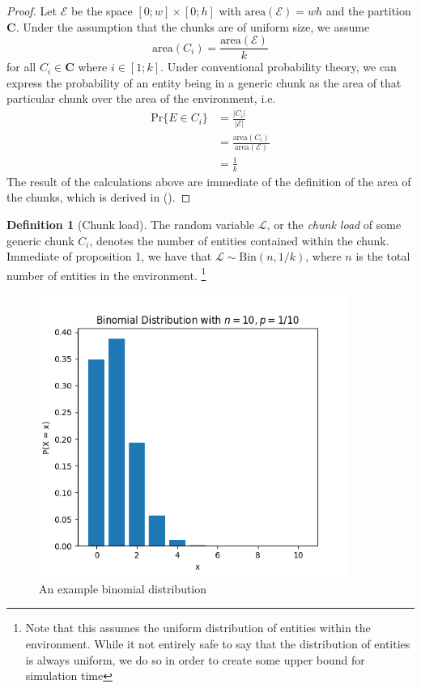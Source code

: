\documentclass[a4paper, 12pt]{report}
\theoremstyle{definition}
\newtheorem{definition}{Definition}[chapter]
\begin{document}
\begin{proof}
    Let $\mathscr E$ be the space $[0; w] \times [0;h]$ with $\text{area}(\mathscr E) = wh$ and the partition $\mathbf C$. Under the assumption that the chunks
    are of uniform size, we assume
    \[
        \text{area}(C_i) = \frac{\text{area}(\mathscr E)}{k} \tag{\textasteriskcentered}
    \]
    for all $C_i \in \mathbf C$ where $i \in [1; k]$. Under conventional probability theory, we can express the probability of an entity being in a generic chunk as
    the area of that particular chunk over the area of the environment, i.e.
    \begin{align*}
        \text{Pr}\{E \in C_i\} &= \frac{|C_i|}{|\mathscr E|} \\
                               &= \frac{\text{area}(C_i)}{\text{area}(\mathscr E)} \\
                               &= \frac{1}{k}
    \end{align*}
    The result of the calculations above are immediate of the definition of the area of the chunks, which is derived in (\textasteriskcentered).
\end{proof}

\begin{definition}[Chunk load]
    The random variable $\mathcal L$, or the \emph{chunk load} of some generic chunk $C_i$,
    denotes the number of entities contained within the chunk. Immediate of proposition 1,
    we have that $\mathcal L \sim \text{Bin}(n, 1/k)$, where $n$ is the total number of entities
    in the environment. \footnote{Note that this assumes the uniform distribution of entities within
    the environment. While it not entirely safe to say that the distribution of entities is always uniform, we do so in order to create some upper bound for simulation time}
\end{definition}

\begin{figure}[ht!]
    \centering
    \includegraphics[width=0.9\textwidth]{img/binomialdistribution.png}
    \caption{An example binomial distribution}
\end{figure}
\end{document}
